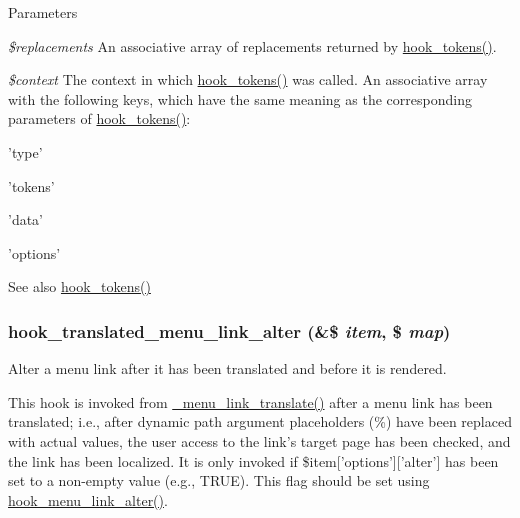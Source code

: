 \begin{DoxyParams}{Parameters}
\item[{\em \$replacements}]An associative array of replacements returned by \hyperlink{group__hooks_ga3bfd87d9a19b2397b0f970e1cff7ea4f}{hook\_\-tokens()}. \item[{\em \$context}]The context in which \hyperlink{group__hooks_ga3bfd87d9a19b2397b0f970e1cff7ea4f}{hook\_\-tokens()} was called. An associative array with the following keys, which have the same meaning as the corresponding parameters of \hyperlink{group__hooks_ga3bfd87d9a19b2397b0f970e1cff7ea4f}{hook\_\-tokens()}:
\begin{DoxyItemize}
\item 'type'
\item 'tokens'
\item 'data'
\item 'options'
\end{DoxyItemize}\end{DoxyParams}
\begin{DoxySeeAlso}{See also}
\hyperlink{group__hooks_ga3bfd87d9a19b2397b0f970e1cff7ea4f}{hook\_\-tokens()} 
\end{DoxySeeAlso}
\hypertarget{group__hooks_ga5b5395b90c4987e29c6f6430fc066e8c}{
\subsubsection[{hook\_\-translated\_\-menu\_\-link\_\-alter}]{\setlength{\rightskip}{0pt plus 5cm}hook\_\-translated\_\-menu\_\-link\_\-alter (\&\$ {\em item}, \/  \$ {\em map})}}
\label{group__hooks_ga5b5395b90c4987e29c6f6430fc066e8c}
Alter a menu link after it has been translated and before it is rendered.

This hook is invoked from \hyperlink{group__menu_ga75bf09f752589011fc9256b041cf7cc0}{\_\-menu\_\-link\_\-translate()} after a menu link has been translated; i.e., after dynamic path argument placeholders (\%) have been replaced with actual values, the user access to the link's target page has been checked, and the link has been localized. It is only invoked if \$item\mbox{[}'options'\mbox{]}\mbox{[}'alter'\mbox{]} has been set to a non-\/empty value (e.g., TRUE). This flag should be set using \hyperlink{group__hooks_ga53f6d87f599e7f585ca84a7e0874df81}{hook\_\-menu\_\-link\_\-alter()}.

